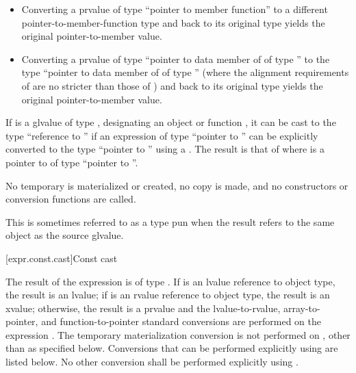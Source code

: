 \begin{itemize}
\item Converting a prvalue of type ``pointer to member function'' to a
different pointer-to-member-function type and back to its original type
yields the original pointer-to-member value.

\item Converting a prvalue of type ``pointer to data member of 
of type '' to the type ``pointer to data member of 
of type '' (where the alignment requirements of  are
no stricter than those of ) and back to its original type
yields the original pointer-to-member value.
\end{itemize}

\pnum
{}%
%
%
If  is a glvalue of type ,
designating an object or function ,
it can be cast to the type ``reference to ''
if an expression of type ``pointer to ''
can be explicitly converted to the type ``pointer to ''
using a .
The result is that of 
where  is a pointer to 
of type ``pointer to ''.
\begin{note}
No temporary is materialized or created,
no copy is made, and
no constructors or conversion
functions are called.
\begin{footnote}
This is sometimes referred to as a type pun
when the result refers to the same object as the source glvalue.
\end{footnote}
\end{note}

[expr.const.cast]{Const cast}

\pnum
{}%
%
The result of the expression  is of type
. If  is an lvalue reference to object type, the result is an
lvalue;
if  is an rvalue reference to object type, the result is an xvalue;
otherwise, the result is a prvalue and the
lvalue-to-rvalue, array-to-pointer,
and function-to-pointer standard conversions are
performed on the expression .
The temporary materialization conversion is not
performed on , other than as specified below.
Conversions that can be performed explicitly using
 are listed below. No other conversion shall be
performed explicitly using .

